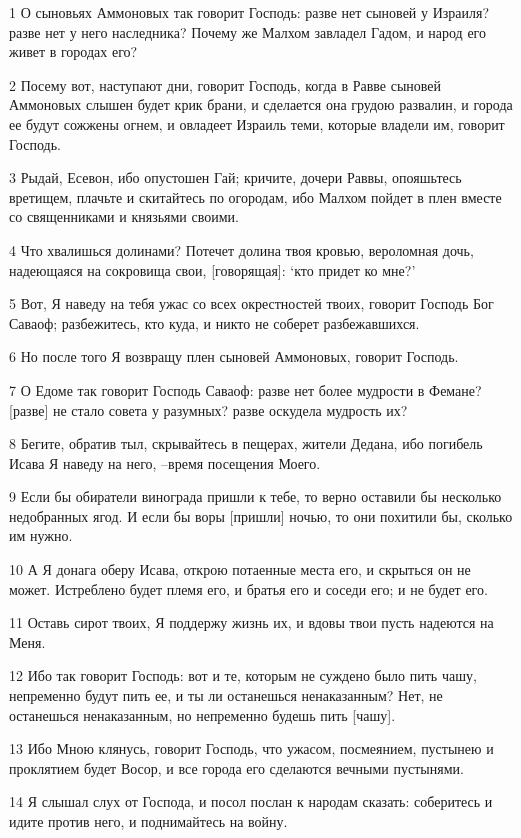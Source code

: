 \par 1 О сыновьях Аммоновых так говорит Господь: разве нет сыновей у Израиля? разве нет у него наследника? Почему же Малхом завладел Гадом, и народ его живет в городах его?
\par 2 Посему вот, наступают дни, говорит Господь, когда в Равве сыновей Аммоновых слышен будет крик брани, и сделается она грудою развалин, и города ее будут сожжены огнем, и овладеет Израиль теми, которые владели им, говорит Господь.
\par 3 Рыдай, Есевон, ибо опустошен Гай; кричите, дочери Раввы, опояшьтесь вретищем, плачьте и скитайтесь по огородам, ибо Малхом пойдет в плен вместе со священниками и князьями своими.
\par 4 Что хвалишься долинами? Потечет долина твоя кровью, вероломная дочь, надеющаяся на сокровища свои, [говорящая]: `кто придет ко мне?'
\par 5 Вот, Я наведу на тебя ужас со всех окрестностей твоих, говорит Господь Бог Саваоф; разбежитесь, кто куда, и никто не соберет разбежавшихся.
\par 6 Но после того Я возвращу плен сыновей Аммоновых, говорит Господь.
\par 7 О Едоме так говорит Господь Саваоф: разве нет более мудрости в Фемане? [разве] не стало совета у разумных? разве оскудела мудрость их?
\par 8 Бегите, обратив тыл, скрывайтесь в пещерах, жители Дедана, ибо погибель Исава Я наведу на него, --время посещения Моего.
\par 9 Если бы обиратели винограда пришли к тебе, то верно оставили бы несколько недобранных ягод. И если бы воры [пришли] ночью, то они похитили бы, сколько им нужно.
\par 10 А Я донага оберу Исава, открою потаенные места его, и скрыться он не может. Истреблено будет племя его, и братья его и соседи его; и не будет его.
\par 11 Оставь сирот твоих, Я поддержу жизнь их, и вдовы твои пусть надеются на Меня.
\par 12 Ибо так говорит Господь: вот и те, которым не суждено было пить чашу, непременно будут пить ее, и ты ли останешься ненаказанным? Нет, не останешься ненаказанным, но непременно будешь пить [чашу].
\par 13 Ибо Мною клянусь, говорит Господь, что ужасом, посмеянием, пустынею и проклятием будет Восор, и все города его сделаются вечными пустынями.
\par 14 Я слышал слух от Господа, и посол послан к народам сказать: соберитесь и идите против него, и поднимайтесь на войну.
